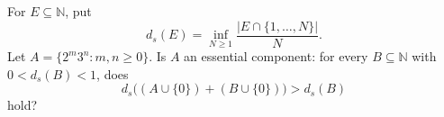 For $E\subseteq\mathbb N$, put
\[
d_s(E)=\inf_{N\geq1}\frac{|E\cap\{1,\ldots,N\}|}{N}.
\]
Let $A=\{2^m3^n:m,n\geq0\}$. Is $A$ an essential component: for every $B\subseteq\mathbb N$ with $0<d_s(B)<1$, does
\[
d_s\bigl((A\cup\{0\})+(B\cup\{0\})\bigr)>d_s(B)
\]
hold?
